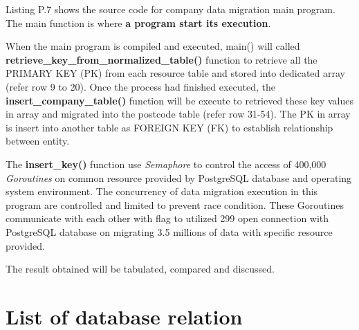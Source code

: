 Listing P.7 shows the source code for company data migration main program. The main function is where \textbf{a program start its execution}. 

When the main program is compiled and executed, main() will called \textbf{retrieve\_key\_from\_normalized\_table()} function to retrieve all the PRIMARY KEY (PK) from each resource table and stored into dedicated array (refer row 9 to 20). Once the process had finished executed, the \textbf{insert\_company\_table()} function will be execute to retrieved these key values in array and migrated into the postcode table (refer row 31-54). The PK in array is insert into another table as FOREIGN KEY (FK) to establish relationship between entity. 

The \textbf{insert\_key()} function use \textit{Semaphore} to control the access of 400,000 \textit{Goroutines} on common resource provided by PostgreSQL database and operating system environment. The concurrency of data migration execution in this program are controlled and limited to prevent race condition. These Goroutines communicate with each other with flag to utilized 299 open connection with PostgreSQL database on migrating 3.5 millions of data with specific resource provided. 

The result obtained will be tabulated, compared and discussed.

\section{List of database relation}

